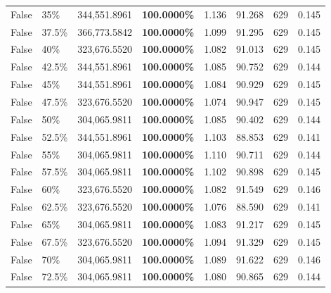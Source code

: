 \begin{table}[H]
\begin{tabular}{|m{}| m{}| r | R{0.13\textwidth}| R{0.09\textwidth}| R{0.09\textwidth}| R{0.09\textwidth}| R{0.11\textwidth}|}
 
False & 35\% & 344,551.8961 & \bfseries \color{red} 100.0000\% & 1.136 & 91.268 & 629 & 0.145 \\
 
False & 37.5\% & 366,773.5842 & \bfseries \color{red} 100.0000\% & 1.099 & 91.295 & 629 & 0.145 \\
 
False & 40\% & 323,676.5520 & \bfseries \color{red} 100.0000\% & 1.082 & 91.013 & 629 & 0.145 \\
 
False & 42.5\% & 344,551.8961 & \bfseries \color{red} 100.0000\% & 1.085 & 90.752 & 629 & 0.144 \\
 
False & 45\% & 344,551.8961 & \bfseries \color{red} 100.0000\% & 1.084 & 90.929 & 629 & 0.145 \\
 
False & 47.5\% & 323,676.5520 & \bfseries \color{red} 100.0000\% & 1.074 & 90.947 & 629 & 0.145 \\
 
False & 50\% & 304,065.9811 & \bfseries \color{red} 100.0000\% & 1.085 & 90.402 & 629 & 0.144 \\
 
False & 52.5\% & 344,551.8961 & \bfseries \color{red} 100.0000\% & 1.103 & 88.853 & 629 & 0.141 \\
 
False & 55\% & 304,065.9811 & \bfseries \color{red} 100.0000\% & 1.110 & 90.711 & 629 & 0.144 \\
 
False & 57.5\% & 304,065.9811 & \bfseries \color{red} 100.0000\% & 1.102 & 90.898 & 629 & 0.145 \\
 
False & 60\% & 323,676.5520 & \bfseries \color{red} 100.0000\% & 1.082 & 91.549 & 629 & 0.146 \\
 
False & 62.5\% & 323,676.5520 & \bfseries \color{red} 100.0000\% & 1.076 & 88.590 & 629 & 0.141 \\
 
False & 65\% & 304,065.9811 & \bfseries \color{red} 100.0000\% & 1.083 & 91.217 & 629 & 0.145 \\
 
False & 67.5\% & 323,676.5520 & \bfseries \color{red} 100.0000\% & 1.094 & 91.329 & 629 & 0.145 \\
 
False & 70\% & 304,065.9811 & \bfseries \color{red} 100.0000\% & 1.089 & 91.622 & 629 & 0.146 \\
 
False & 72.5\% & 304,065.9811 & \bfseries \color{red} 100.0000\% & 1.080 & 90.865 & 629 & 0.144 \\
 

\end{tabular}
\end{table}
